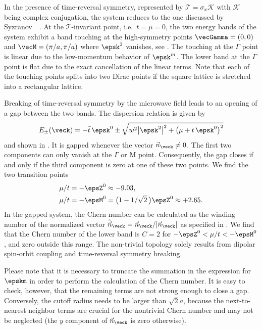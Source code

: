 In the presence of time-reversal symmetry, represented by $\mathcal{T}=\sigma_x \mathcal{K}$ with $\mathcal{K}$ being complex conjugation, the system reduces to the one discussed by Syzranov~\etal~\cite{Syzranov2014}.
At the $\mathcal{T}$-invariant point, i.e.~$t=\mu=0$, the two energy bands of the system exhibit a band touching at the high-symmetry points $\vecGamma=(0,0)$ and $\vecM=(\pi/a, \pi/a)$ where $\epsk^2$ vanishes, see .
The touching at the $\Gamma$ point is linear due to the low-momentum behavior of $\epsk^m$.
The lower band at the $\Gamma$ point is flat due to the exact cancellation of the linear terms.
Note that each of the touching points splits into two Dirac points if the square lattice is stretched into a rectangular lattice.

Breaking of time-reversal symmetry by the microwave field leads to an opening of a gap between the two bands.
The dispersion relation is given by
\begin{align}
    E_\pm(\veck)=- \bar{t}\, \epsk^0 \pm \sqrt{w^2 \big|\epsk^2\big|^2+\big(\mu+t\, \epsk^0\big)^2}
\end{align}
and shown in .
It is gapped whenever the vector $\vec{n}_{\veck}\ne 0$.
The first two components can only vanish at the $\Gamma$ or $\text{M}$ point.
Consequently, the gap closes if and only if the third component is zero at one of these two points.
We find the two transition points
\begin{align}
    \mu/t &= -\epsZ^0 \approx -9.03, \\
    \mu/t &= -\epsM^0 = \big(1-1/\sqrt{2}\,\big)\epsZ^0 \approx +2.65.
\end{align}
In the gapped system, the Chern number can be calculated as the winding number of the normalized vector $\hat{\vec{n}}_\veck = \vec{n}_\veck/|\vec{n}_\veck|$ as specified in .
We find that the Chern number of the lower band is $C=2$ for $-\epsZ^0 < \mu/t < -\epsM^0$, and zero outside this range.
The non-trivial topology solely results from dipolar spin-orbit coupling and time-reversal symmetry breaking.

Please note that it is necessary to truncate the summation in the expression for $\epskm$ in order to perform the calculation of the Chern number.
It is easy to check, however, that the remaining terms are not strong enough to close a gap.
Conversely, the cutoff radius needs to be larger than $\sqrt{2}a$, because the next-to-nearest neighbor terms are crucial for the nontrivial Chern number and may not be neglected (the $y$ component of $\vec{n}_\veck$ is zero otherwise).

